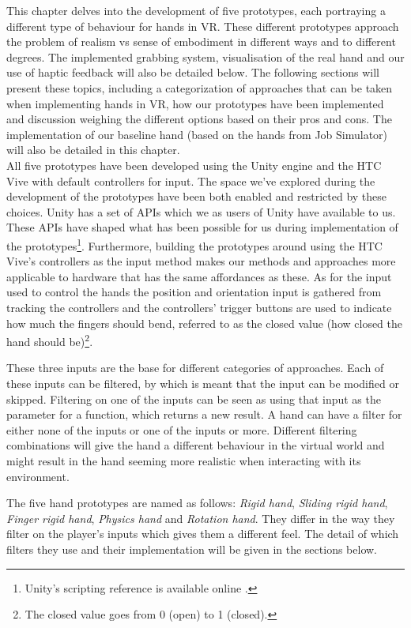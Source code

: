 This chapter delves into the development of five prototypes, each portraying a different type of behaviour for hands in VR. These different prototypes approach the problem of realism vs sense of embodiment in different ways and to different degrees. The implemented grabbing system, visualisation of the real hand and our use of haptic feedback will also be detailed below. The following sections will present these topics, including a categorization of approaches that can be taken when implementing hands in VR, how our prototypes have been implemented and discussion weighing the different options based on their pros and cons. The implementation of our baseline hand (based on the hands from Job Simulator) will also be detailed in this chapter.\\

All five prototypes have been developed using the Unity engine and the HTC Vive with default controllers for input. The space we've explored during the development of the prototypes have been both enabled and restricted by these choices. Unity has a set of APIs which we as users of Unity have available to us. These APIs have shaped what has been possible for us during implementation of the prototypes\footnote{Unity's scripting reference is available online \parencite{UnityScriptingReference2017}.}. Furthermore, building the prototypes around using the HTC Vive's controllers as the input method makes our methods and approaches more applicable to hardware that has the same affordances as these. As for the input used to control the hands the position and orientation input is gathered from tracking the controllers and the controllers' trigger buttons are used to indicate how much the fingers should bend, referred to as the closed value (how closed the hand should be)\footnote{The closed value goes from 0 (open) to 1 (closed).}.

These three inputs are the base for different categories of approaches. Each of these inputs can be filtered, by which is meant that the input can be modified or skipped. Filtering on one of the inputs can be seen as using that input as the parameter for a function, which returns a new result. A hand can have a filter for either none of the inputs or one of the inputs or more. Different filtering combinations will give the hand a different behaviour in the virtual world and might result in the hand seeming more realistic when interacting with its environment.

The five hand prototypes are named as follows: \textit{Rigid hand}, \textit{Sliding rigid hand}, \textit{Finger rigid hand}, \textit{Physics hand} and \textit{Rotation hand}. They differ in the way they filter on the player's inputs which gives them a different feel. The detail of which filters they use and their implementation will be given in the sections below.

